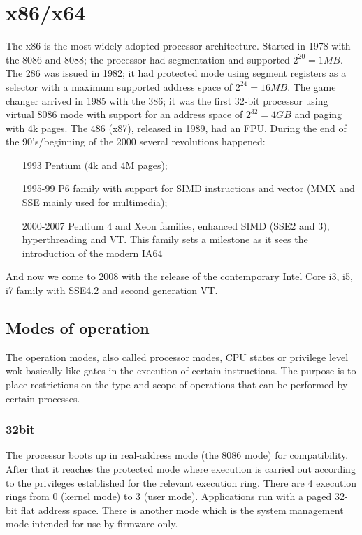 \documentclass[paper=a4, fontsize=11pt]{report} %
\numberwithin{equation}{section} %
\numberwithin{figure}{section} %
\numberwithin{table}{section} %
\begin{document}
\section{x86/x64}
The x86 is the most widely adopted processor architecture. Started in 1978 with 
the 8086 and 8088; the processor had segmentation and supported $2^{20} = 1MB$.
The 286 was issued in 1982; it had protected mode using segment registers as a 
selector with a maximum supported address space of $2^{24} = 16MB$. The game 
changer arrived in 1985 with the 386; it was the first 32-bit processor using 
virtual 8086 mode with support for an address space of $2^{32} = 4GB$ and 
paging with 4k pages. The 486 (x87), released in 1989, had an FPU. During the 
end of the 90's/beginning of the 2000 several revolutions happened:
\begin{itemize}
    \item[1993] Pentium (4k and 4M pages);
    \item[1995-99] P6 family with support for SIMD instructions and vector (MMX 
    and SSE mainly used for multimedia);
    \item[2000-2007] Pentium 4 and Xeon families, enhanced SIMD (SSE2 and 3), 
    hyperthreading and VT. This family sets a milestone as it sees the 
    introduction of the modern IA64
\end{itemize}
And now we come to 2008 with the release of the contemporary Intel Core i3, i5, 
i7 family with SSE4.2 and second generation VT.
\subsection{Modes of operation}
The operation modes, also called processor modes, CPU states or privilege level 
wok basically like gates in the execution of certain instructions. The purpose 
is to place restrictions on the type and scope of operations that can be 
performed by certain processes.
\subsubsection{32bit}
The processor boots up in \underline{real-address mode} (the 8086 mode) for compatibility. 
After that it reaches the \underline{protected mode} where execution is carried out according to the privileges established for the relevant execution ring. There are 4 execution rings from 0 (kernel mode) to 3 (user mode). Applications run with a paged 32-bit flat address space. There is another mode which is the 
system management mode intended for use by firmware only.
\end{document}
